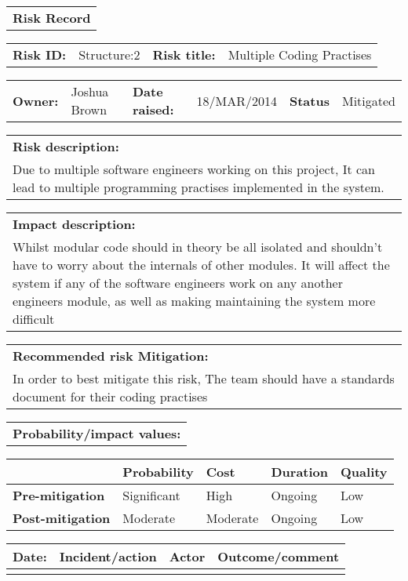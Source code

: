 \begin{table}
	\begin{tabularx}{\textwidth}{| X |}
		\hline
		\textbf{Risk Record} \\
	\end{tabularx}
	\begin{tabularx}{\textwidth}{| l | X | l | X |}
		\hline
		\textbf{Risk ID:} & Structure:2 & \textbf{Risk title:} & Multiple Coding Practises  \\
	\end{tabularx}
	\begin{tabularx}{\textwidth}{| l | X | l | X | l | X |}
		\hline
		\textbf{Owner:} & Joshua Brown & \textbf{Date raised:} & 18/MAR/2014 & \textbf{Status} & Mitigated \\
	\end{tabularx}
	\begin{tabularx}{\textwidth}{| X |}
		\hline
		\textbf{Risk description:} \\ Due to multiple software engineers working on this project, It can lead to multiple programming practises implemented in the system.  \\
	\end{tabularx}
	\begin{tabularx}{\textwidth}{| X |}
		\hline
		\textbf{Impact description:} \\ Whilst modular code should in theory be all isolated and shouldn't have to worry about the internals of other modules. It will affect the system if any of the software engineers work on any another engineers module, as well as making maintaining the system more difficult \\
	\end{tabularx}
	\begin{tabularx}{\textwidth}{| X |}
		\hline
		\textbf{Recommended risk Mitigation:} \\ In order to best mitigate this risk, The team should have a standards document for their coding practises  \\
	\end{tabularx}
	\begin{tabularx}{\textwidth}{| X |}
		\hline
		\textbf{Probability/impact values:} \\
	\end{tabularx}
	\begin{tabularx}{\textwidth}{| l | l | X | X | X |}
		\hline
		 &  \textbf{Probability} & \textbf{Cost} & \textbf{Duration} & \textbf{Quality} \\ \hline
		\textbf{Pre-mitigation} & Significant & High & Ongoing & Low \\ \hline
		\textbf{Post-mitigation} & Moderate & Moderate & Ongoing & Low \\ \hline \hline
	\end{tabularx}
	\begin{tabularx}{\textwidth}{| l | X | l | X |}
		\hline
		\textbf{Date:} & \textbf{Incident/action} & \textbf{Actor} & \textbf{Outcome/comment} \\ \hline
		 &  &  &  \\ \hline
	\end{tabularx}%
\end{table}

